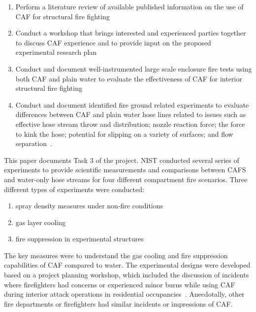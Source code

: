 \documentclass[12pt,oneside]{book}
\begin{document}
\begin{enumerate}
\item  Perform a literature review of available published information on the use of CAF for structural fire fighting~\cite{Mitchell:1}
\item  Conduct a workshop that brings interested and experienced parties together to discuss CAF experience and to provide input on the proposed experimental research plan~\cite{Grant:2011} 
\item  Conduct and document well-instrumented large scale enclosure fire tests using both CAF and plain water to evaluate the effectiveness of CAF for interior structural fire fighting
\item  Conduct and document identified fire ground related experiments to evaluate differences between CAF and plain water hose lines related to issues such as effective hose stream throw and distribution; nozzle reaction force; the force to kink the hose; potential for slipping on a variety of surfaces; and flow separation~\cite{Carracino:2013,Dicus:2013,LaPolla:2012}. 
\end{enumerate}

This paper documents Task 3 of the project. NIST conducted several series of experiments to provide scientific measurements and comparisons between CAFS and water-only hose streams for four different compartment fire scenarios.  Three different types of experiments were conducted:
\begin{enumerate}
\item spray density measures under non-fire conditions
\item gas layer cooling
\item fire suppression in experimental structures
\end{enumerate}

The key measures were to understand the gas cooling and fire suppression capabilities of CAF compared to water. The experimental designs were developed based on a project planning workshop, which included the discussion of incidents where firefighters had concerns or experienced minor burns while using CAF during interior attack operations in residential occupancies~\cite{Grant:2011}. Anecdotally, other fire departments or firefighters had similar incidents or impressions of CAF.
\end{document}
